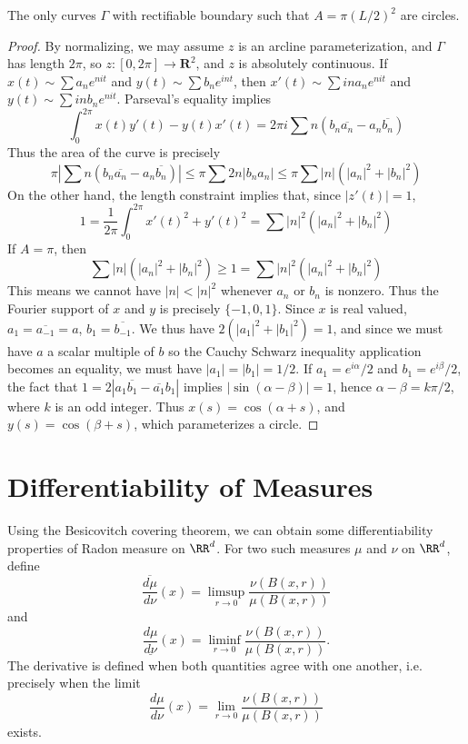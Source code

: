 \begin{theorem}
  The only curves $\Gamma$ with rectifiable boundary such that $A = \pi (L/2)^2$ are circles.
\end{theorem}
\begin{proof}
By normalizing, we may assume $z$ is an arcline parameterization, and $\Gamma$ has length $2\pi$, so $z:[0,2\pi] \to \mathbf{R}^2$, and $z$ is absolutely continuous. If $x(t) \sim \sum a_n e^{nit}$ and $y(t) \sim \sum b_n e^{int}$, then $x'(t) \sim \sum i n a_n e^{n i t}$ and $y(t) \sim \sum i n b_n e^{nit}$. Parseval's equality implies
%
\[ \int_0^{2\pi} x(t) y'(t) - y(t) x'(t) = 2 \pi i \sum n (b_n \overline{a_n} - a_n \overline{b_n}) \]
%
Thus the area of the curve is precisely
%
\[ \pi \left| \sum n (b_n \overline{a_n} - a_n \overline{b_n}) \right| \leq \pi \sum 2n|b_na_n| \leq \pi \sum |n|(|a_n|^2 + |b_n|^2) \]
%
On the other hand, the length constraint implies that, since $|z'(t)| = 1$,
%
\[ 1 = \frac{1}{2\pi} \int_0^{2\pi} x'(t)^2 + y'(t)^2 = \sum |n|^2(|a_n|^2 + |b_n|^2) \]
%
If $A = \pi$, then
%
\[ \sum |n| (|a_n|^2 + |b_n|^2) \geq 1 = \sum |n|^2 (|a_n|^2 + |b_n|^2) \]
%
This means we cannot have $|n| < |n|^2$ whenever $a_n$ or $b_n$ is nonzero. Thus the Fourier support of $x$ and $y$ is precisely $\{ -1, 0, 1 \}$. Since $x$ is real valued, $a_1 = \overline{a_{-1}} = a$, $b_1 = \overline{b_{-1}}$. We thus have $2(|a_1|^2 + |b_1|^2) = 1$, and since we must have $a$ a scalar multiple of $b$ so the Cauchy Schwarz inequality application becomes an equality, we must have $|a_1| = |b_1| = 1/2$. If $a_1 = e^{i\alpha}/2$ and $b_1 = e^{i\beta}/2$, the fact that $1 = 2|a_1\overline{b_1} - \overline{a_1}b_1|$ implies $|\sin(\alpha - \beta)| = 1$, hence $\alpha - \beta = k \pi /2$, where $k$ is an odd integer. Thus $x(s) = \cos(\alpha + s)$, and $y(s) = \cos(\beta + s)$, which parameterizes a circle.
\end{proof}

\section{Differentiability of Measures}

Using the Besicovitch covering theorem, we can obtain some differentiability properties of Radon measure on $\RR^d$. For two such measures $\mu$ and $\nu$ on $\RR^d$, define
%
\[ \overline{\frac{d\mu}{d \nu}}(x) = \limsup_{r \to 0} \frac{\nu(B(x,r))}{\mu(B(x,r))} \]
%
and
%
\[ \underline{\frac{d\mu}{d\nu}}(x) = \liminf_{r \to 0} \frac{\nu(B(x,r))}{\mu(B(x,r))}. \]
%
The derivative is defined when both quantities agree with one another, i.e. precisely when the limit
%
\[ \frac{d\mu}{d \nu}(x) = \lim_{r \to 0} \frac{\nu(B(x,r))}{\mu(B(x,r))} \]
%
exists.

